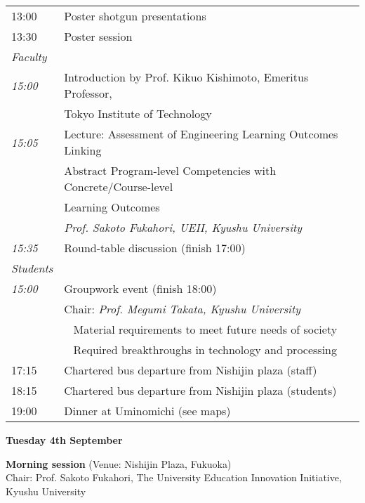 \vspace{1em}
\noindent\begin{tabular}{|l|l|}
    \hline
    13:00   & Poster shotgun presentations \\
    13:30   & Poster session \\
    \hline
    \emph{Faculty} & \\
    \hspace{1em}\emph{15:00} & Introduction by Prof. Kikuo Kishimoto, Emeritus Professor, \\
                             & Tokyo Institute of Technology \\
    \hspace{1em}\emph{15:05} & Lecture: Assessment of Engineering Learning Outcomes Linking \\
                             & Abstract Program-level Competencies with Concrete/Course-level \\
                             & Learning Outcomes \\  
                             & \emph{Prof. Sakoto Fukahori,   UEII, Kyushu University} \\
    \hspace{1em}\emph{15:35} & Round-table discussion (finish 17:00) \\
    \hline
    \emph{Students} & \\
    \hspace{1em}\emph{15:00} & Groupwork event (finish 18:00) \\
            & Chair: {\em Prof. Megumi Takata, Kyushu University} \\
            & ~ Material requirements to meet future needs of society \\
            & ~ Required breakthroughs in technology and processing \\
    \hline
    17:15   & Chartered bus departure from Nishijin plaza (staff) \\
    18:15   & Chartered bus departure from Nishijin plaza (students) \\
    19:00   & Dinner at Uminomichi (see maps) \\
    \hline
\end{tabular}

\newpage
\begin{center}
{\bf \large Tuesday 4th September}
\end{center}
\vspace*{3ex}
{\bf Morning session} (Venue: Nishijin Plaza, Fukuoka)\\
Chair: Prof. Sakoto Fukahori,  The University Education Innovation Initiative, Kyushu University

